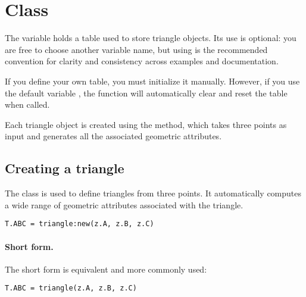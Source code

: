 \newpage
\section{Class } %
\label{sec:class_triangle}

The variable  holds a table used to store triangle objects. Its use is optional: you are free to choose another variable name, but using   is the recommended convention for clarity and consistency across examples and documentation.

\medskip
\noindent
If you define your own table, you must initialize it manually. However, if you use the default variable  , the  function will automatically clear and reset the   table when called.

\medskip
\noindent
Each triangle object is created using the  method, which takes three points as input and generates all the associated geometric attributes.

\vspace{1em}

\subsection{Creating a triangle} %
\label{sub:creating_a_triangle}

The  class is used to define triangles from three points. It automatically computes a wide range of geometric attributes associated with the triangle.

\begin{mybox}
\begin{verbatim}
T.ABC = triangle:new(z.A, z.B, z.C)
\end{verbatim}
\end{mybox}

\paragraph{Short form.}
The short form  is equivalent and more commonly used:

\begin{mybox}
\begin{verbatim}
T.ABC = triangle(z.A, z.B, z.C)
\end{verbatim}
\end{mybox}

